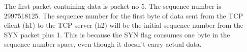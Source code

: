 The first packet containing data is packet no 5. The sequence number is 2997518125. The sequence number for the first byte of data sent from the TCP client (h1) to the TCP server (h2) will be the initial sequence number from the SYN packet plus 1. This is because the SYN flag consumes one byte in the sequence number space, even though it doesn't carry actual data.